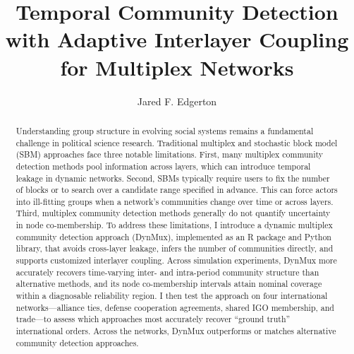 \documentclass[11pt, letterpaper]{article}
\begin{document}
\begin{titlingpage}
\thispagestyle{empty}
\clearpage\thispagestyle{empty}
\clearpage
\renewcommand{\abstractname}{} %
\renewcommand{\absnamepos}{empty} %
\title{Temporal Community Detection with Adaptive Interlayer Coupling for Multiplex Networks}\bigskip
\author{Jared F. Edgerton}
\clearpage\maketitle

\begin{abstract}
\noindent Understanding group structure in evolving social systems remains a fundamental challenge in political science research. Traditional multiplex and stochastic block model (SBM) approaches face three notable limitations. First, many multiplex community detection methods pool information across layers, which can introduce temporal leakage in dynamic networks. Second, SBMs typically require users to fix the number of blocks or to search over a candidate range specified in advance. This can force actors into ill-fitting groups when a network's communities change over time or across layers. Third, multiplex community detection methods generally do not quantify uncertainty in node co-membership. To address these limitations, I introduce a dynamic multiplex community detection approach (DynMux), implemented as an R package and Python library, that avoids cross-layer leakage, infers the number of communities directly, and supports customized interlayer coupling. Across simulation experiments, DynMux more accurately recovers time-varying inter- and intra-period community structure than alternative methods, and its node co-membership intervals attain nominal coverage within a diagnosable reliability region. I then test the approach on four international networks---alliance ties, defense cooperation agreements, shared IGO membership, and trade---to assess which approaches most accurately recover “ground truth” international orders. Across the networks, DynMux outperforms or matches alternative community detection approaches. 
\end{abstract}


\end{titlingpage}
\end{document}
